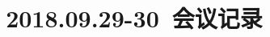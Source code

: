 \documentclass[10pt,a4paper]{article}
\begin{document}
\graphicspath{{Figures}}
%
\renewcommand{\abstractname}{\small{\CJKfamily{hei} 摘\quad 要}} %
\renewcommand{\refname}{\centering\CJKfamily{hei} 参考文献}
\renewcommand{\figurename}{{\bf Fig}.}
\renewcommand{\tablename}{{\bf Tab}.}

\makeatletter
\long{}
\makeatother

\newcommand{\keywords}[1]{{\hspace{0\ccwd}\small{\CJKfamily{hei} 关键词:}{\hspace{2ex}{#1}}\bigskip}}



\title{2018.09.29-30~会议记录}

\author{
\small
\small
}
\date{}					%
\maketitle
\end{document}
